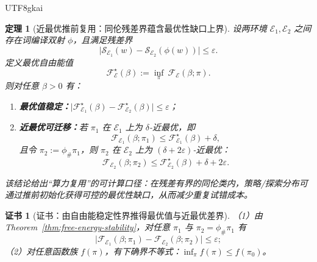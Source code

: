 \documentclass[12pt]{article}
\newtheorem{theorem}{定理}[section]
\newtheorem{certificate}{证书}[section]
\begin{document}
\begin{CJK*}{UTF8}{gkai}
\begin{theorem}[近最优推前复用：同伦残差界蕴含最优性缺口上界]
\label{thm:near-optimal-pushforward}
设两环境 $\mathcal{E}_1,\mathcal{E}_2$ 之间存在词编译双射 $\phi$，且满足残差界
\[
\bigl|\mathcal{S}_{\mathcal{E}_1}(w)-\mathcal{S}_{\mathcal{E}_2}(\phi(w))\bigr|\le \varepsilon.
\]
定义最优自由能值
\[
\mathcal{F}_{\mathcal{E}}^\star(\beta):=\inf_{\pi}\ \mathcal{F}_{\mathcal{E}}(\beta;\pi).
\]
则对任意 $\beta>0$ 有：
\begin{enumerate}
  \item \textbf{最优值稳定：}$\bigl|\mathcal{F}_{\mathcal{E}_1}^\star(\beta)-\mathcal{F}_{\mathcal{E}_2}^\star(\beta)\bigr|\le
    \varepsilon$；
  \item \textbf{近最优可迁移：}若 $\pi_1$ 在 $\mathcal{E}_1$ 上为 $\delta$-近最优，即
  \[
  \mathcal{F}_{\mathcal{E}_1}(\beta;\pi_1)\le \mathcal{F}_{\mathcal{E}_1}^\star(\beta)+\delta,
  \]
  且令 $\pi_2:=\phi_{\#}\pi_1$，则 $\pi_2$ 在 $\mathcal{E}_2$ 上为 $(\delta+2\varepsilon)$-近最优：
  \[
  \mathcal{F}_{\mathcal{E}_2}(\beta;\pi_2)\le \mathcal{F}_{\mathcal{E}_2}^\star(\beta)+\delta+2\varepsilon.
  \]
\end{enumerate}
该结论给出“算力复用”的可计算口径：在残差有界的同伦类内，策略/探索分布可通过推前初始化获得可控的最优性缺口，从而减少重复试错成本。
\end{theorem}

\begin{certificate}[证书：由自由能稳定性界推得最优值与近最优差界]
\label{cert:near-optimal-pushforward}
（1）由 Theorem~\ref{thm:free-energy-stability}，对任意 $\pi_1$ 与 $\pi_2=\phi_{\#}\pi_1$ 有
\[
\bigl|\mathcal{F}_{\mathcal{E}_1}(\beta;\pi_1)-\mathcal{F}_{\mathcal{E}_2}(\beta;\pi_2)\bigr|\le \varepsilon;
\]
（2）对任意函数族 $f(\pi)$，有下确界不等式：$\inf_{\pi} f(\pi)\le f(\pi_0)$。
\end{certificate}


\end{CJK*}
\end{document}

